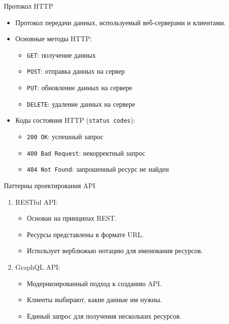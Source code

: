 \documentclass[
  ignorenonframetext,
  aspectratio=169,
  aspectratio=169]{beamer}
\newcommand{\passthrough}[1]{#1}
\providecommand{\tightlist}{%
  \setlength{\itemsep}{0pt}\setlength{\parskip}{0pt}}
\begin{document}
\begin{frame}[fragile]{Протокол HTTP}
\protect\hypertarget{ux43fux440ux43eux442ux43eux43aux43eux43b-http}{}
\begin{itemize}
\tightlist
\item
  Протокол передачи данных, используемый веб-серверами и клиентами.
\item
  Основные методы HTTP:

  \begin{itemize}
  \tightlist
  \item
    \passthrough{\lstinline!GET!}: получение данных
  \item
    \passthrough{\lstinline!POST!}: отправка данных на сервер
  \item
    \passthrough{\lstinline!PUT!}: обновление данных на сервере
  \item
    \passthrough{\lstinline!DELETE!}: удаление данных на сервере
  \end{itemize}
\item
  Коды состояния HTTP (\passthrough{\lstinline!status codes!}):

  \begin{itemize}
  \tightlist
  \item
    \passthrough{\lstinline!200 OK!}: успешный запрос
  \item
    \passthrough{\lstinline!400 Bad Request!}: некорректный запрос
  \item
    \passthrough{\lstinline!404 Not Found!}: запрошенный ресурс не
    найден
  \end{itemize}
\end{itemize}
\end{frame}

\begin{frame}{Паттерны проектирования API}
\protect\hypertarget{ux43fux430ux442ux442ux435ux440ux43dux44b-ux43fux440ux43eux435ux43aux442ux438ux440ux43eux432ux430ux43dux438ux44f-api}{}
\begin{enumerate}
\tightlist
\item
  RESTful API:

  \begin{itemize}
  \tightlist
  \item
    Основан на принципах REST.
  \item
    Ресурсы представлены в формате URL.
  \item
    Использует верблюжью нотацию для именования ресурсов.
  \end{itemize}
\item
  GraphQL API:

  \begin{itemize}
  \tightlist
  \item
    Модернизированный подход к созданию API.
  \item
    Клиенты выбирают, какие данные им нужны.
  \item
    Единый запрос для получения нескольких ресурсов.
  \end{itemize}
\end{enumerate}
\end{frame}
\end{document}
